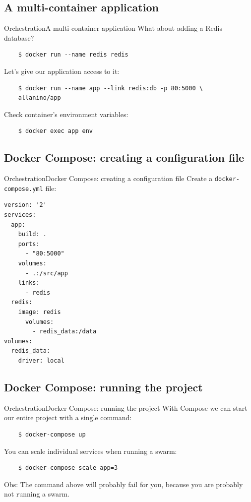 \documentclass[10pt]{beamer}
\begin{document}
\subsection{A multi-container application}
\begin{frame}[fragile]{Orchestration}{A multi-container application}
	What about adding a Redis database?

	\begin{verbatim}
	$ docker run --name redis redis
	\end{verbatim}

	Let's give our application access to it:

	\begin{verbatim}
	$ docker run --name app --link redis:db -p 80:5000 \
    allanino/app
	\end{verbatim}

	Check container's environment variables:
	\begin{verbatim}
	$ docker exec app env
	\end{verbatim}
\end{frame}
\subsection{Docker Compose: creating a configuration file}
\begin{frame}[fragile]{Orchestration}{Docker Compose: creating a configuration file}
	Create a \texttt{docker-compose.yml} file:
	\begin{verbatim}
version: '2'
services:
  app:
    build: .
    ports:
      - "80:5000"
    volumes:
      - .:/src/app
    links:
      - redis
  redis:
    image: redis
      volumes:
        - redis_data:/data
volumes:
  redis_data:
    driver: local
	\end{verbatim}
\end{frame}
\subsection{Docker Compose: running the project}
\begin{frame}[fragile]{Orchestration}{Docker Compose: running the project}
	With Compose we can start our entire project with a single command:
	
	\begin{verbatim}
	$ docker-compose up
	\end{verbatim}
	
	You can scale individual services when running a swarm:
	\begin{verbatim}
	$ docker-compose scale app=3
	\end{verbatim}
	
	Obs: The command above will probably fail for you, because you are probably not running a swarm. 
\end{frame}
\end{document}
